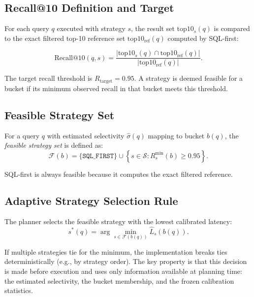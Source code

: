 \documentclass[10pt,twocolumn]{article}
\begin{document}
\subsection{Recall@10 Definition and Target}

For each query $q$ executed with strategy $s$, the result set $\text{top}10_s(q)$ is compared to the exact filtered top-10 reference set $\text{top}10_{\text{ref}}(q)$ computed by SQL-first:

\begin{equation}
\text{Recall@10}(q, s) = \frac{|\text{top}10_s(q) \cap \text{top}10_{\text{ref}}(q)|}{|\text{top}10_{\text{ref}}(q)|}.
\end{equation}

The target recall threshold is $R_{\text{target}} = 0.95$. A strategy is deemed feasible for a bucket if its minimum observed recall in that bucket meets this threshold.

\subsection{Feasible Strategy Set}

For a query $q$ with estimated selectivity $\hat{\sigma}(q)$ mapping to bucket $b(q)$, the \emph{feasible strategy set} is defined as:
\begin{equation}
\mathcal{F}(b) = \{\texttt{SQL\_FIRST}\} \cup \left\{ s \in \mathcal{S} : R^{\min}_s(b) \geq 0.95 \right\}.
\end{equation}

SQL-first is always feasible because it computes the exact filtered reference.

\subsection{Adaptive Strategy Selection Rule}

The planner selects the feasible strategy with the lowest calibrated latency:
\begin{equation}
s^*(q) = \arg\min_{s \in \mathcal{F}(b(q))} \widehat{L}_s(b(q)).
\label{eq:decision_rule}
\end{equation}

If multiple strategies tie for the minimum, the implementation breaks ties deterministically (e.g., by strategy order). The key property is that this decision is made before execution and uses only information available at planning time: the estimated selectivity, the bucket membership, and the frozen calibration statistics.
\end{document}
